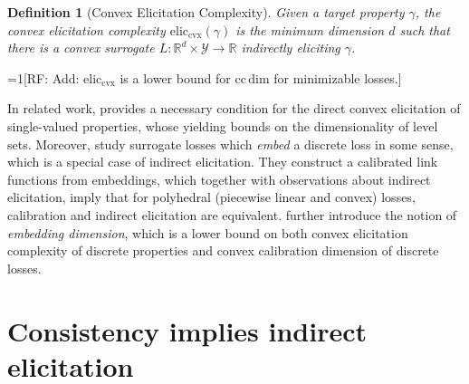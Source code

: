 \documentclass{article}
\newcommand{\Comments}{1}
\newcommand{\mynote}[2]{\ifnum\Comments=1\textcolor{#1}{#2}\fi}
\newcommand{\mytodo}[2]{\ifnum\Comments=1%
	\todo[linecolor=#1!80!black,backgroundcolor=#1,bordercolor=#1!80!black]{#2}\fi}
\newcommand{\raf}[1]{\mynote{green!80!blue}{[RF: #1]}}
\newcommand{\btw}[1]{\mytodo{gray!10!white}{\textcolor{gray}{BTW: #1}}}%
\newcommand{\reals}{\mathbb{R}}
\newcommand{\eliccvx}{\mathrm{elic}_\mathrm{cvx}}
\newcommand{\ccdim}{\mathrm{cc\,dim}}
\newcommand{\Y}{\mathcal{Y}}
\newtheorem{definition}{Definition}
\begin{document}
\begin{definition}[Convex Elicitation Complexity]
	Given a target property $\gamma$, the \emph{convex elicitation complexity} $\eliccvx(\gamma)$ is the minimum dimension $d$ such that there is a convex surrogate \mbox{$L : \reals^d \times \Y \to \reals$} indirectly eliciting $\gamma$.
\end{definition}
\raf{Add: $\eliccvx$ is a lower bound for $\ccdim$ for minimizable losses.}


In related work,
\cite[Corollary 10]{agarwal2015consistent} provides a necessary condition for the direct convex elicitation of single-valued properties, whose yielding bounds on the dimensionality of level sets.
Moreover, \citet{finocchiaro2019embedding} study surrogate losses which \emph{embed} a discrete loss in some sense, which is a special case of indirect elicitation.
They construct a calibrated link functions from embeddings, which together with observations about indirect elicitation, imply that for polyhedral (piecewise linear and convex) losses, calibration and indirect elicitation are equivalent.
\citet{finocchiaro2020embedding} further introduce the notion of \emph{embedding dimension}, which is a lower bound on both convex elicitation complexity of discrete properties and convex calibration dimension of discrete losses.


\section{Consistency implies indirect elicitation}\label{sec:consis-implies-indir}
\end{document}
